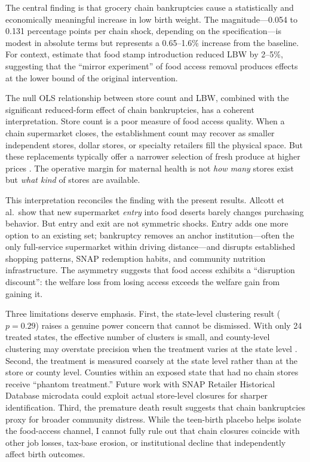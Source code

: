 \documentclass[12pt]{article}
\begin{document}
The central finding is that grocery chain bankruptcies cause a statistically and economically meaningful increase in low birth weight. The magnitude---0.054 to 0.131 percentage points per chain shock, depending on the specification---is modest in absolute terms but represents a 0.65--1.6\% increase from the baseline. For context, \citet{hoynes2011can} estimate that food stamp introduction reduced LBW by 2--5\%, suggesting that the ``mirror experiment'' of food access removal produces effects at the lower bound of the original intervention.

The null OLS relationship between store count and LBW, combined with the significant reduced-form effect of chain bankruptcies, has a coherent interpretation. Store count is a poor measure of food access quality. When a chain supermarket closes, the establishment count may recover as smaller independent stores, dollar stores, or specialty retailers fill the physical space. But these replacements typically offer a narrower selection of fresh produce at higher prices \citep{handbury2015goods}. The operative margin for maternal health is not \textit{how many} stores exist but \textit{what kind} of stores are available.

This interpretation reconciles the \citet{allcott2019food} finding with the present results. Allcott et al.\ show that new supermarket \textit{entry} into food deserts barely changes purchasing behavior. But entry and exit are not symmetric shocks. Entry adds one more option to an existing set; bankruptcy removes an anchor institution---often the only full-service supermarket within driving distance---and disrupts established shopping patterns, SNAP redemption habits, and community nutrition infrastructure. The asymmetry suggests that food access exhibits a ``disruption discount'': the welfare loss from losing access exceeds the welfare gain from gaining it.

Three limitations deserve emphasis. First, the state-level clustering result ($p = 0.29$) raises a genuine power concern that cannot be dismissed. With only 24 treated states, the effective number of clusters is small, and county-level clustering may overstate precision when the treatment varies at the state level \citep{abadie2023should}. Second, the treatment is measured coarsely at the state level rather than at the store or county level. Counties within an exposed state that had no chain stores receive ``phantom treatment.'' Future work with SNAP Retailer Historical Database microdata could exploit actual store-level closures for sharper identification. Third, the premature death result suggests that chain bankruptcies proxy for broader community distress. While the teen-birth placebo helps isolate the food-access channel, I cannot fully rule out that chain closures coincide with other job losses, tax-base erosion, or institutional decline that independently affect birth outcomes.
\end{document}
